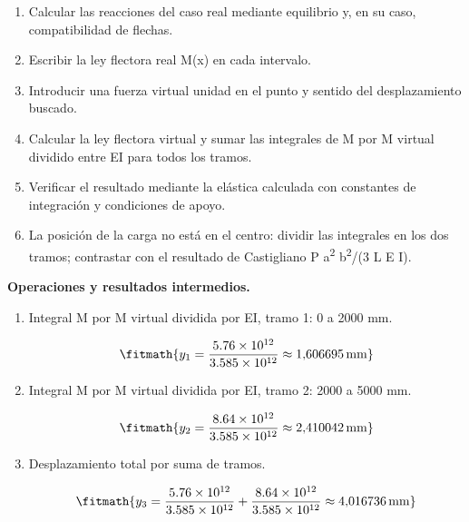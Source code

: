 \begin{enumerate}

\item Calcular las reacciones del caso real mediante equilibrio y, en su caso, compatibilidad de flechas.

\item Escribir la ley flectora real M(x) en cada intervalo.

\item Introducir una fuerza virtual unidad en el punto y sentido del desplazamiento buscado.

\item Calcular la ley flectora virtual y sumar las integrales de M por M virtual dividido entre EI para todos los tramos.

\item Verificar el resultado mediante la elástica calculada con constantes de integración y condiciones de apoyo.

\item La posición de la carga no está en el centro: dividir las integrales en los dos tramos; contrastar con el resultado de Castigliano P a\textsuperscript{2} b\textsuperscript{2}/(3 L E I).

\end{enumerate}

\noindent\textbf{Operaciones y resultados intermedios.}

\begin{enumerate}

\item Integral M por M virtual dividida por EI, tramo 1: 0 a 2000 mm.

\[\fitmath{y_{1}=\frac{5.76\times10^{12}}{3.585\times10^{12}}\approx 1{,}606695\,\mathrm{mm}}\]

\item Integral M por M virtual dividida por EI, tramo 2: 2000 a 5000 mm.

\[\fitmath{y_{2}=\frac{8.64\times10^{12}}{3.585\times10^{12}}\approx 2{,}410042\,\mathrm{mm}}\]

\item Desplazamiento total por suma de tramos.

\[\fitmath{y_{3}=\frac{5.76\times10^{12}}{3.585\times10^{12}}+\frac{8.64\times10^{12}}{3.585\times10^{12}}\approx 4{,}016736\,\mathrm{mm}}\]

\end{enumerate}
